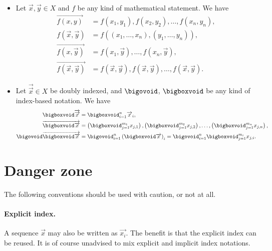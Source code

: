\documentclass[a4paper, 8pt]{article}
\begin{document}
\begin{multicols}{2}
\begin{itemize}
	\item Let $\overrightarrow{x}, \overrightarrow{y} \in X$ and $f$ be any kind of mathematical statement. We have
		\begin{align*}
			\overrightarrow{f (x, y)} &= f (x_1, y_1), f (x_2, y_2), \ldots, f (x_n, y_n) , \\
			f (\overrightarrow{x}, \overrightarrow{y}) &= f ((x_1, \ldots, x_n), (y_1, \ldots, y_n)) , \\
			\overrightarrow{f (x, \overrightarrow{y})} &= f (x_1, \overrightarrow{y}), \ldots, f (x_n, \overrightarrow{y}) , \\
			\overrightarrow{f (\overrightarrow{x}, \overrightarrow{y})} &= f (\overrightarrow{x}, \overrightarrow{y}), f (\overrightarrow{x}, \overrightarrow{y}), \ldots, f (\overrightarrow{x}, \overrightarrow{y}) .
		\end{align*}

	\item Let $\overrightarrow{\overrightarrow{x}} \in X$ be doubly indexed, and $\bigovoid$, $\bigboxvoid$ be any kind of index-based notation. We have
		\begin{align*}
			\bigboxvoid \overrightarrow{\overrightarrow{x}} &= \bigboxvoid_{i = 1}^n \overrightarrow{x}_i , \\
			\overrightarrow{\bigboxvoid \overrightarrow{x}} &= \left( \bigboxvoid_{j = 1}^{m_1} x_{j, 1} \right), \left( \bigboxvoid_{j = 1}^{m_2} x_{j, 2} \right), \ldots, \left( \bigboxvoid_{j = 1}^{m_n} x_{j, n} \right) , \\
			\bigovoid \overrightarrow{\bigboxvoid \overrightarrow{x}} &= \bigovoid_{i = 1}^n \left( \bigboxvoid \overrightarrow{x} \right)_i = \bigovoid_{i = 1}^n \bigboxvoid_{j = 1}^{m_i} x_{j, i} .
		\end{align*}

\end{itemize}

\section{Danger zone}

The following conventions should be used with caution, or not at all.

\paragraph{Explicit index.} A sequence $\overrightarrow{x}$ may also be written as $\overrightarrow{x_i}$. The benefit is that the explicit index can be reused. It is of course unadvised to mix explicit and implicit index notations.


\end{multicols}
\end{document}
